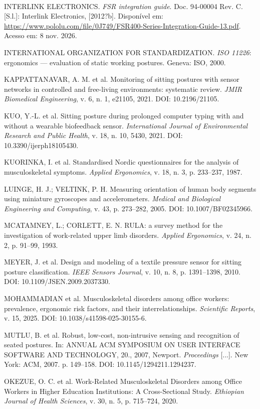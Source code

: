 \begin{singlespace}
INTERLINK ELECTRONICS. \emph{FSR\textsuperscript{\textregistered} integration
guide}. Doc. 94-00004 Rev. C. [S.l.]: Interlink Electronics, [2012?b].
Disponível em: \url{https://www.pololu.com/file/0J749/FSR400-Series-Integration-Guide-13.pdf}.
Acesso em: 8 nov. 2026.

INTERNATIONAL ORGANIZATION FOR STANDARDIZATION. \emph{ISO 11226}: ergonomics ---
evaluation of static working postures. Geneva: ISO, 2000.

KAPPATTANAVAR, A. M. et al. Monitoring of sitting postures with sensor networks in
controlled and free-living environments: systematic review. \emph{JMIR Biomedical
Engineering}, v. 6, n. 1, e21105, 2021. DOI: 10.2196/21105.

KUO, Y.-L. et al. Sitting posture during prolonged computer typing with and
without a wearable biofeedback sensor. \emph{International Journal of
Environmental Research and Public Health}, v. 18, n. 10, 5430, 2021. DOI:
10.3390/ijerph18105430.

KUORINKA, I. et al. Standardised Nordic questionnaires for the analysis of
musculoskeletal symptoms. \emph{Applied Ergonomics}, v. 18, n. 3, p. 233--237,
1987.

LUINGE, H. J.; VELTINK, P. H. Measuring orientation of human body segments using
miniature gyroscopes and accelerometers. \emph{Medical and Biological Engineering
and Computing}, v. 43, p. 273--282, 2005. DOI: 10.1007/BF02345966.

MCATAMNEY, L.; CORLETT, E. N. RULA: a survey method for the investigation of
work-related upper limb disorders. \emph{Applied Ergonomics}, v. 24, n. 2,
p. 91--99, 1993.

MEYER, J. et al. Design and modeling of a textile pressure sensor for sitting
posture classification. \emph{IEEE Sensors Journal}, v. 10, n. 8,
p. 1391--1398, 2010. DOI: 10.1109/JSEN.2009.2037330.

MOHAMMADIAN et al. Musculoskeletal disorders among office workers: prevalence,
ergonomic risk factors, and their interrelationships. \emph{Scientific Reports},
v. 15, 2025. DOI: 10.1038/s41598-025-30155-6.

MUTLU, B. et al. Robust, low-cost, non-intrusive sensing and recognition of
seated postures. In: ANNUAL ACM SYMPOSIUM ON USER INTERFACE SOFTWARE AND
TECHNOLOGY, 20., 2007, Newport. \emph{Proceedings} [...]. New York: ACM, 2007.
p. 149--158. DOI: 10.1145/1294211.1294237.

OKEZUE, O. C. et al. Work-Related Musculoskeletal Disorders among Office Workers
in Higher Education Institutions: A Cross-Sectional Study. \emph{Ethiopian
Journal of Health Sciences}, v. 30, n. 5, p. 715--724, 2020.


\end{singlespace}
